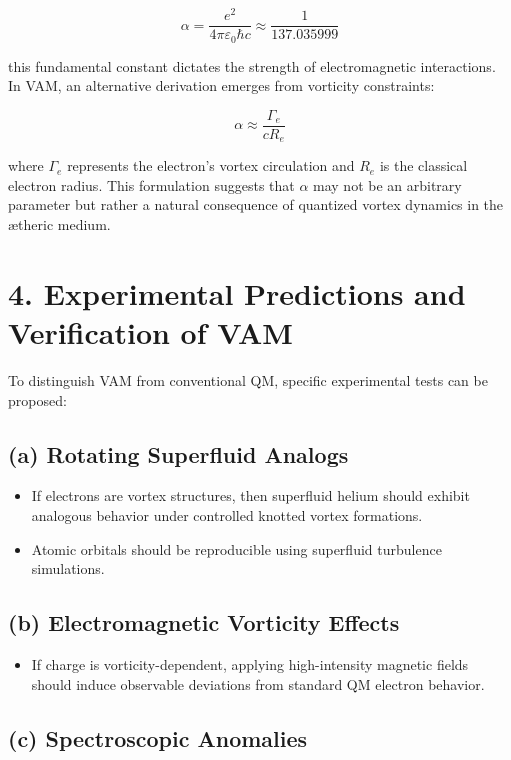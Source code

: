 \[
    \alpha = \frac{e^2}{4\pi \varepsilon_0 \hbar c} \approx \frac{1}{137.035999}
\]

this fundamental constant dictates the strength of electromagnetic interactions. In VAM, an alternative derivation emerges from vorticity constraints:

\[
    \alpha \approx \frac{\Gamma_e}{c R_e}
\]

where \(\Gamma_e\) represents the electron's vortex circulation and \(R_e\) is the classical electron radius. This formulation suggests that \(\alpha\) may not be an arbitrary parameter but rather a natural consequence of quantized vortex dynamics in the ætheric medium.

\section*{4. Experimental Predictions and Verification of VAM}

To distinguish VAM from conventional QM, specific experimental tests can be proposed:

\subsection*{(a) Rotating Superfluid Analogs}

\begin{itemize}
    \item If electrons are vortex structures, then superfluid helium should exhibit analogous behavior under controlled knotted vortex formations.
    \item Atomic orbitals should be reproducible using superfluid turbulence simulations.
\end{itemize}

\subsection*{(b) Electromagnetic Vorticity Effects}

\begin{itemize}
    \item If charge is vorticity-dependent, applying high-intensity magnetic fields should induce observable deviations from standard QM electron behavior.
\end{itemize}

\subsection*{(c) Spectroscopic Anomalies}

